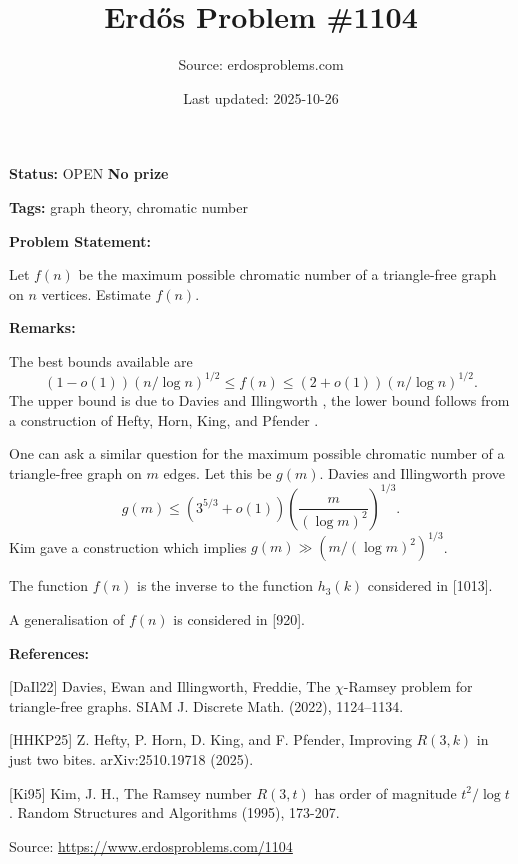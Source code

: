 \documentclass{article}
\title{Erd\H{o}s Problem \#1104}
\date{Last updated: 2025-10-26}
\author{Source: erdosproblems.com}
\begin{document}
\maketitle

\noindent\textbf{Status:} OPEN \quad \textbf{No prize}

\noindent\textbf{Tags:} graph theory, chromatic number

\medskip
\noindent\textbf{Problem Statement:}

Let $f(n)$ be the maximum possible chromatic number of a triangle-free graph on $n$ vertices. Estimate $f(n)$.

\bigskip
\noindent\textbf{Remarks:}

The best bounds available are\[(1-o(1))(n/\log n)^{1/2}\leq f(n) \leq (2+o(1))(n/\log n)^{1/2}.\]The upper bound is due to Davies and Illingworth \cite{DaIl22}, the lower bound follows from a construction of Hefty, Horn, King, and Pfender \cite{HHKP25}.

One can ask a similar question for the maximum possible chromatic number of a triangle-free graph on $m$ edges. Let this be $g(m)$. Davies and Illingworth \cite{DaIl22} prove\[g(m) \leq (3^{5/3}+o(1))\left(\frac{m}{(\log m)^2}\right)^{1/3}.\]Kim \cite{Ki95} gave a construction which implies $g(m) \gg (m/(\log m)^2)^{1/3}$.

The function $f(n)$ is the inverse to the function $h_3(k)$ considered in [1013].

A generalisation of $f(n)$ is considered in [920].

\bigskip
\noindent\textbf{References:}

[DaIl22] Davies, Ewan and Illingworth, Freddie, The {$\chi$}-{R}amsey problem for triangle-free graphs. SIAM J. Discrete Math. (2022), 1124--1134.
 
 [HHKP25] Z. Hefty, P. Horn, D. King, and F. Pfender, Improving $R(3,k)$ in just two bites. arXiv:2510.19718 (2025).
 
 [Ki95] Kim, J. H., The Ramsey number $R(3,t)$ has order of magnitude $t^2/\log t$. Random Structures and Algorithms (1995), 173-207.

\bigskip
\noindent\small{Source: \url{https://www.erdosproblems.com/1104}}
\end{document}
